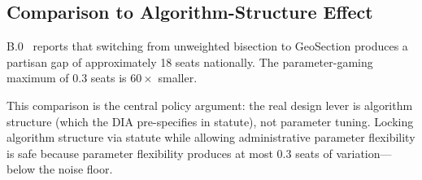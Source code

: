 \subsection{Comparison to Algorithm-Structure Effect}

B.0~\citep{b0paper} reports that switching from unweighted bisection to
GeoSection produces a partisan gap of approximately 18 seats nationally.
The parameter-gaming maximum of 0.3 seats is $60\times$ smaller.

This comparison is the central policy argument:
the real design lever is algorithm structure (which the DIA pre-specifies
in statute), not parameter tuning.
Locking algorithm structure via statute while allowing administrative
parameter flexibility is safe because parameter flexibility produces
at most 0.3 seats of variation---below the noise floor.
